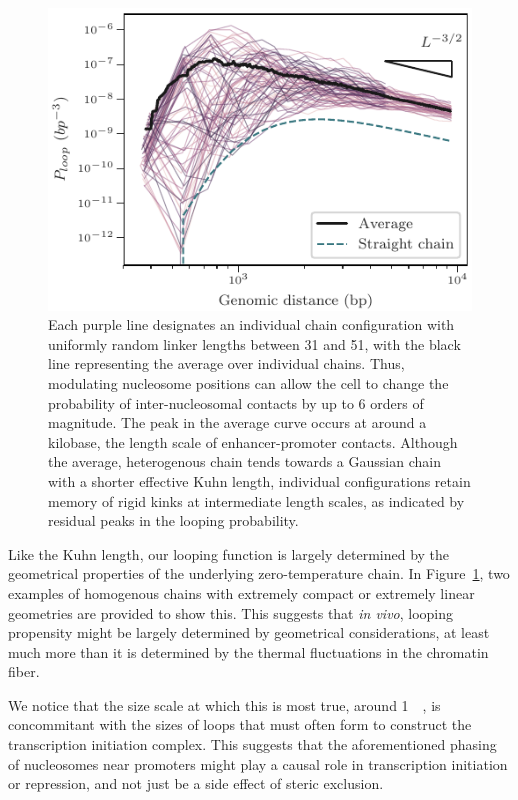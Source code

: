 \documentclass[%
 reprint,
superscriptaddress,
showpacs,preprintnumbers,
 amsmath,amssymb,
 aps,
 prl,
]{revtex4-1}
\begin{document}
\begin{figure}[t]
    \centering
    \includegraphics[width=0.95\linewidth]{./figures/fig5_looping_hetero31to52bp.pdf}
    \caption{Each purple line designates an individual chain configuration
    with uniformly random linker lengths between 31 and \SI{51}{\basepair}, with
    the black line representing the average over individual chains. Thus, modulating nucleosome positions can allow the cell to change
    the probability of inter-nucleosomal contacts by up to 6 orders of
    magnitude. The peak in the average curve occurs at around a kilobase, the
    length scale of enhancer-promoter contacts. Although the average,
    heterogenous chain tends towards a Gaussian chain with a shorter
    effective Kuhn length, individual configurations retain memory of rigid kinks
    at intermediate length scales, as indicated by residual peaks in the looping
    probability.}\label{fig:looping}
\end{figure}

Like the Kuhn length, our looping function is largely determined by the
    geometrical properties of the underlying zero-temperature chain.
In Figure~\ref{fig:looping}, two examples of homogenous chains with extremely
    compact or extremely linear geometries are provided to show this.
This suggests that \textit{in vivo}, looping propensity might be largely
    determined by geometrical considerations, at least much more than it is
    determined by the thermal fluctuations in the chromatin fiber.

We notice that the size scale at which this is most true, around
    \SI{1}{\kilo\basepair}, is concommitant with the sizes of loops that must
    often form to construct the transcription initiation complex.
This suggests that the aforementioned phasing of nucleosomes near promoters
    might play a causal role in transcription initiation or repression, and not
    just be a side effect of steric exclusion.
\end{document}
